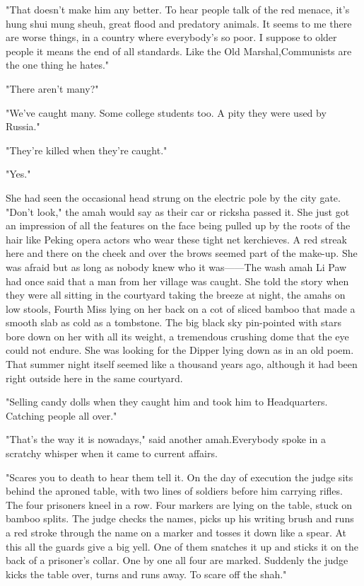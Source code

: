 \par "That doesn't make him any better. To hear people talk of the red menace, it's hung shui mung sheuh, great flood and predatory animals. It seems to me there are worse things, in a country where everybody's so poor. I suppose to older people it means the end of all standards. Like the Old Marshal,Communists are the one thing he hates."
\par "There aren't many?"
\par "We've caught many. Some college students too. A pity they were used by Russia."
\par "They're killed when they're caught."
\par "Yes."
\par She had seen the occasional head strung on the electric pole by the city gate. "Don't look," the amah would say as their car or ricksha passed it. She just got an impression of all the features on the face being pulled up by the roots of the hair like Peking opera actors who wear these tight net kerchieves. A red streak here and there on the cheek and over the brows seemed part of the make-up. She was afraid but as long as nobody knew who it was——The wash amah Li Paw had once said that a man from her village was caught. She told the story when they were all sitting in the courtyard taking the breeze at night, the amahs on low stools, Fourth Miss lying on her back on a cot of sliced bamboo that made a smooth slab as cold as a tombstone. The big black sky pin-pointed with stars bore down on her with all its weight, a tremendous crushing dome that the eye could not endure. She was looking for the Dipper lying down as in an old poem. That summer night itself seemed like a thousand years ago, although it had been right outside here in the same courtyard.
\par "Selling candy dolls when they caught him and took him to Headquarters. Catching people all over."
\par "That's the way it is nowadays," said another amah.Everybody spoke in a scratchy whisper when it came to current affairs.
\par "Scares you to death to hear them tell it. On the day of execution the judge sits behind the aproned table, with two lines of soldiers before him carrying rifles. The four prisoners kneel in a row. Four markers are lying on the table, stuck on bamboo splits. The judge checks the names, picks up his writing brush and runs a red stroke through the name on a marker and tosses it down like a spear. At this all the guards give a big yell. One of them snatches it up and sticks it on the back of a prisoner's collar. One by one all four are marked. Suddenly the judge kicks the table over, turns and runs away. To scare off the shah."
